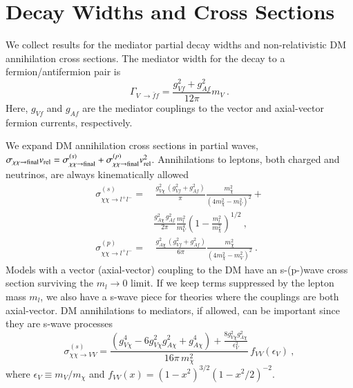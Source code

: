 \documentclass[final,5p,twocolumn]{elsarticle}
\newcommand{\be}{\begin{equation}}
\newcommand{\ee}{\end{equation}}
\begin{document}
\appendix

\section{Decay Widths and Cross Sections}
\label{app:XS}

We collect results for the mediator partial decay widths and non-relativistic DM annihilation cross sections. The mediator width for the decay to a fermion/antifermion pair is
\be
\Gamma_{V \; \rightarrow \bar{f} f} = \frac{g_{Vf}^2 + g_{Af}^2}{12 \pi} m_V \ .
\ee
Here, $g_{Vf}$ and $g_{Af}$ are the mediator couplings to the vector and axial-vector fermion currents, respectively. 

We expand DM annihilation cross sections in partial waves, $\sigma_{\chi \chi \rightarrow {\rm final}} v_{\rm rel} = \sigma^{(s)}_{\chi \chi \rightarrow {\rm final}} +
\sigma^{(p)}_{\chi \chi \rightarrow {\rm final}} v_{\rm rel}^2$.  Annihilations to leptons, both charged and neutrinos, are always kinematically allowed 
\begin{align}
\label{eq:sigma0leptons} \sigma^{(s)}_{\chi \chi \rightarrow l^+ l^-} = & \,
\frac{g_{V \chi}^2  \, (g_{Vf}^2 + g_{Af}^2)}{\pi} 
\frac{m_\chi^2}{(4 m_\chi^2 - m_V^2)^2} + \\ & \nonumber
\frac{g_{A \chi}^2  \, g_{Af}^2}{2 \pi} \frac{m_l^2}{m_V^4} \left( 1 - \frac{m_l^2}{m_\chi^2}\right)^{1/2}  \ , \\
\label{eq:sigma1leptons} \sigma^{(p)}_{\chi \chi \rightarrow l^+ l^-}  = & \, \frac{g_{A \chi}^2  \, 
(g_{Vf}^2 + g_{Af}^2)}{6 \pi} \frac{m_\chi^2}{(4 m_\chi^2 - m_V^2)^2} \ .
\end{align}
Models with a vector (axial-vector) coupling to the DM have an s-(p-)wave cross section surviving the $m_l \rightarrow 0$ limit. If we keep terms suppressed by the lepton mass $m_l$, we also have a s-wave piece for theories where the couplings are both axial-vector.  DM annihilations to mediators, if allowed, can be important since they are s-wave processes
\be
\sigma^{(s)}_{\chi \chi \rightarrow V V} = \frac{(g_{V\chi}^4 - 6 g_{V\chi}^2 g_{A\chi}^2 + g_{A\chi}^4) + \frac{8 g_{V\chi}^2 g_{A\chi}^2}{\epsilon_V^2} }{16 \pi \, m_\chi^2} \, f_{VV}(\epsilon_V)   \ ,
\ee
where $\epsilon_V \equiv m_V / m_\chi$ and $f_{VV}(x) = (1 -x^2)^{3/2} (1 - x^2 / 2)^{-2}$.
\end{document}
